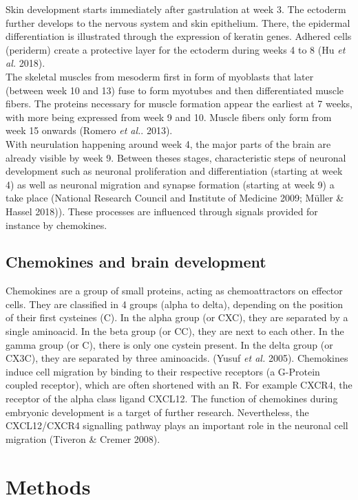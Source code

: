 \documentclass[
]{article}
\begin{document}
Skin development starts immediately after gastrulation at week 3. The ectoderm further develops to the nervous system and skin epithelium. There, the epidermal differentiation is illustrated through the expression of keratin genes. Adhered cells (periderm) create a protective layer for the ectoderm during weeks 4 to 8 (Hu \emph{et al.} 2018).\\
The skeletal muscles from mesoderm first in form of myoblasts that later (between week 10 and 13) fuse to form myotubes and then differentiated muscle fibers. The proteins necessary for muscle formation appear the earliest at 7 weeks, with more being expressed from week 9 and 10. Muscle fibers only form from week 15 onwards (Romero \emph{et al.}. 2013).\\
With neurulation happening around week 4, the major parts of the brain are already visible by week 9. Between theses stages, characteristic steps of neuronal development such as neuronal proliferation and differentiation (starting at week 4) as well as neuronal migration and synapse formation (starting at week 9) a take place (National Research Council and Institute of Medicine 2009; Müller \& Hassel 2018)). These processes are influenced through signals provided for instance by chemokines.

\hypertarget{intro-brain}{%
\subsection{Chemokines and brain development}\label{intro-brain}}

Chemokines are a group of small proteins, acting as chemoattractors on effector cells. They are classified in 4 groups (alpha to delta), depending on the position of their first cysteines (C). In the alpha group (or CXC), they are separated by a single aminoacid. In the beta group (or CC), they are next to each other. In the gamma group (or C), there is only one cystein present. In the delta group (or CX3C), they are separated by three aminoacids. (Yusuf \emph{et al.} 2005). Chemokines induce cell migration by binding to their respective receptors (a G-Protein coupled receptor), which are often shortened with an R. For example CXCR4, the receptor of the alpha class ligand CXCL12. The function of chemokines during embryonic development is a target of further research. Nevertheless, the CXCL12/CXCR4 signalling pathway plays an important role in the neuronal cell migration (Tiveron \& Cremer 2008).

\hypertarget{methods}{%
\section{Methods}\label{methods}}
\end{document}
